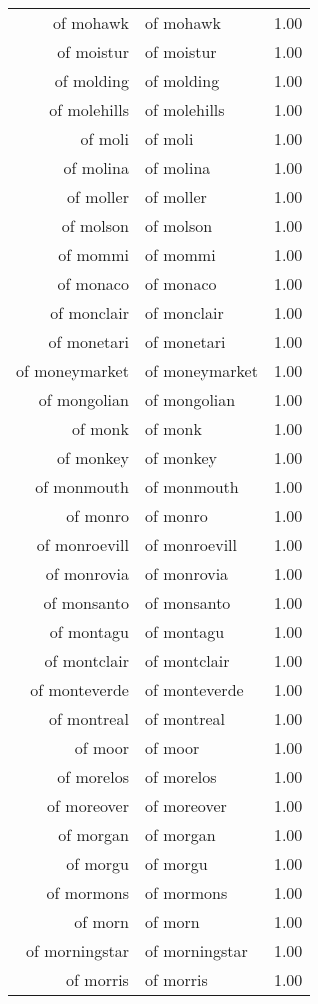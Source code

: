 \begin{table}[ht]
\begin{tabular}{rlr}
  of mohawk & of mohawk & 1.00 \\ 
  of moistur & of moistur & 1.00 \\ 
  of molding & of molding & 1.00 \\ 
  of molehills & of molehills & 1.00 \\ 
  of moli & of moli & 1.00 \\ 
  of molina & of molina & 1.00 \\ 
  of moller & of moller & 1.00 \\ 
  of molson & of molson & 1.00 \\ 
  of mommi & of mommi & 1.00 \\ 
  of monaco & of monaco & 1.00 \\ 
  of monclair & of monclair & 1.00 \\ 
  of monetari & of monetari & 1.00 \\ 
  of moneymarket & of moneymarket & 1.00 \\ 
  of mongolian & of mongolian & 1.00 \\ 
  of monk & of monk & 1.00 \\ 
  of monkey & of monkey & 1.00 \\ 
  of monmouth & of monmouth & 1.00 \\ 
  of monro & of monro & 1.00 \\ 
  of monroevill & of monroevill & 1.00 \\ 
  of monrovia & of monrovia & 1.00 \\ 
  of monsanto & of monsanto & 1.00 \\ 
  of montagu & of montagu & 1.00 \\ 
  of montclair & of montclair & 1.00 \\ 
  of monteverde & of monteverde & 1.00 \\ 
  of montreal & of montreal & 1.00 \\ 
  of moor & of moor & 1.00 \\ 
  of morelos & of morelos & 1.00 \\ 
  of moreover & of moreover & 1.00 \\ 
  of morgan & of morgan & 1.00 \\ 
  of morgu & of morgu & 1.00 \\ 
  of mormons & of mormons & 1.00 \\ 
  of morn & of morn & 1.00 \\ 
  of morningstar & of morningstar & 1.00 \\ 
  of morris & of morris & 1.00 \\ 

\end{tabular}
\end{table}
